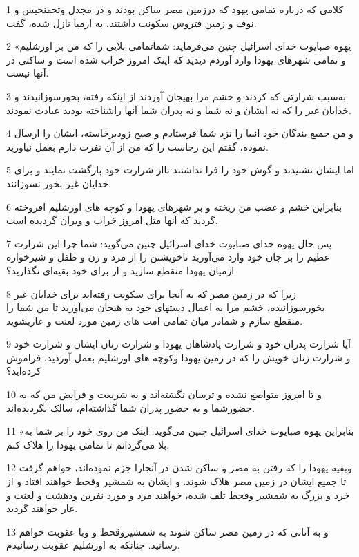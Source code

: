 \par 1 کلامی که درباره تمامی یهود که درزمین مصر ساکن بودند و در مجدل وتحفنحیس و نوف و زمین فتروس سکونت داشتند، به ارمیا نازل شده، گفت:
\par 2 «یهوه صبایوت خدای اسرائیل چنین می‌فرماید: شماتمامی بلایی را که من بر اورشلیم و تمامی شهرهای یهودا وارد آوردم دیدید که اینک امروز خراب شده است و ساکنی در آنها نیست.
\par 3 به‌سبب شرارتی که کردند و خشم مرا بهیجان آوردند از اینکه رفته، بخور‌سوزانیدند و خدایان غیر را که نه ایشان و نه شما و نه پدران شما آنها راشناخته بودید عبادت نمودند.
\par 4 و من جمیع بندگان خود انبیا را نزد شما فرستادم و صبح زودبرخاسته، ایشان را ارسال نموده، گفتم این رجاست را که من از آن نفرت دارم بعمل نیاورید.
\par 5 اما ایشان نشنیدند و گوش خود را فرا نداشتند تااز شرارت خود بازگشت نمایند و برای خدایان غیر بخور نسوزانند.
\par 6 بنابراین خشم و غضب من ریخته و بر شهرهای یهودا و کوچه های اورشلیم افروخته گردید که آنها مثل امروز خراب و ویران گردیده است.
\par 7 پس حال یهوه خدای صبایوت خدای اسرائیل چنین می‌گوید: شما چرا این شرارت عظیم را بر جان خود وارد می‌آورید تاخویشتن را از مرد و زن و طفل و شیرخواره ازمیان یهودا منقطع سازید و از برای خود بقیه‌ای نگذارید؟
\par 8 زیرا که در زمین مصر که به آنجا برای سکونت رفته‌اید برای خدایان غیر بخورسوزانیده، خشم مرا به اعمال دستهای خود به هیجان می‌آورید تا من شما را منقطع سازم و شمادر میان تمامی امت های زمین مورد لعنت و عاربشوید.
\par 9 آیا شرارت پدران خود و شرارت پادشاهان یهودا و شرارت زنان ایشان و شرارت خود و شرارت زنان خویش را که در زمین یهودا وکوچه های اورشلیم بعمل آوردید، فراموش کرده‌اید؟
\par 10 و تا امروز متواضع نشده و ترسان نگشته‌اند و به شریعت و فرایض من که به حضورشما و به حضور پدران شما گذاشته‌ام، سالک نگردیده‌اند.
\par 11 «بنابراین یهوه صبایوت خدای اسرائیل چنین می‌گوید: اینک من روی خود را بر شما به بلا می‌گردانم تا تمامی یهودا را هلاک کنم.
\par 12 وبقیه یهودا را که رفتن به مصر و ساکن شدن در آنجارا جزم نموده‌اند، خواهم گرفت تا جمیع ایشان در زمین مصر هلاک شوند. و ایشان به شمشیر وقحط خواهند افتاد و از خرد و بزرگ به شمشیر وقحط تلف شده، خواهند مرد و مورد نفرین ودهشت و لعنت و عار خواهند گردید.
\par 13 و به آنانی که در زمین مصر ساکن شوند به شمشیروقحط و وبا عقوبت خواهم رسانید. چنانکه به اورشلیم عقوبت رسانیدم.

